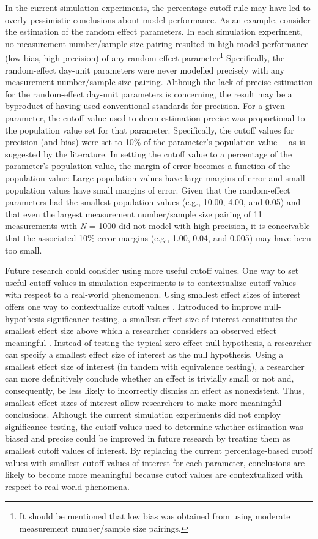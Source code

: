 \documentclass[
12pt, %
twoside,
english]{guelphthesis}
\begin{document}
In the current simulation experiments, the percentage-cutoff rule may have led to overly pessimistic conclusions about model performance. As an example, consider the estimation of the random effect parameters. In each simulation experiment, no measurement number/sample size pairing resulted in high model performance (low bias, high precision) of any random-effect parameter\footnote{It should be mentioned that low bias was obtained from using moderate measurement number/sample size pairings.} Specifically, the random-effect day-unit parameters were never modelled precisely with any measurement number/sample size pairing. Although the lack of precise estimation for the random-effect day-unit parameters is concerning, the result may be a byproduct of having used conventional standards for precision. For a given parameter, the cutoff value used to deem estimation precise was proportional to the population value set for that parameter. Specifically, the cutoff values for precision (and bias) were set to 10\% of the parameter's population value \autocite{muthen1997}---as is suggested by the literature. In setting the cutoff value to a percentage of the parameter's population value, the margin of error becomes a function of the population value: Large population values have large margins of error and small population values have small margins of error. Given that the random-effect parameters had the smallest population values (e.g., 10.00, 4.00, and 0.05) and that even the largest measurement number/sample size pairing of 11 measurements with \emph{N} = 1000 did not model with high precision, it is conceivable that the associated 10\%-error margins (e.g., 1.00, 0.04, and 0.005) may have been too small.

Future research could consider using more useful cutoff values. One way to set useful cutoff values in simulation experiments is to contextualize cutoff values with respect to a real-world phenomenon. Using smallest effect sizes of interest offers one way to contextualize cutoff values \autocite{lakens2017,lakens2018}. Introduced to improve null-hypothesis significance testing, a smallest effect size of interest constitutes the smallest effect size above which a researcher considers an observed effect meaningful \autocite{lakens2017}. Instead of testing the typical zero-effect null hypothesis, a researcher can specify a smallest effect size of interest as the null hypothesis. Using a smallest effect size of interest (in tandem with equivalence testing), a researcher can more definitively conclude whether an effect is trivially small or not and, consequently, be less likely to incorrectly dismiss an effect as nonexistent. Thus, smallest effect sizes of interest allow researchers to make more meaningful conclusions. Although the current simulation experiments did not employ significance testing, the cutoff values used to determine whether estimation was biased and precise could be improved in future research by treating them as smallest cutoff values of interest. By replacing the current percentage-based cutoff values with smallest cutoff values of interest for each parameter, conclusions are likely to become more meaningful because cutoff values are contextualized with respect to real-world phenomena.
\end{document}
